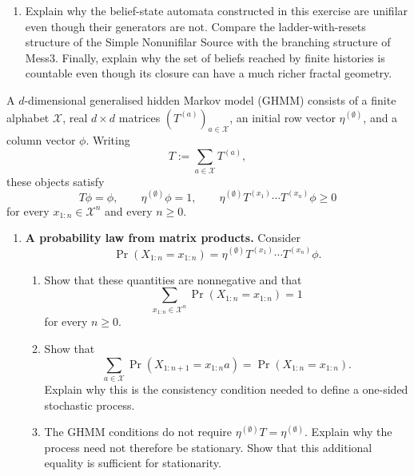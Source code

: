 \documentclass[11pt]{article}
\begin{document}
\begin{exercise}
\begin{enumerate}
\begin{enumerate}
        \item Explain why the belief-state automata constructed in this
          exercise are unifilar even though their generators are not. Compare
          the ladder-with-resets structure of the Simple Nonunifilar Source
          with the branching structure of Mess3. Finally, explain why the set
          of beliefs reached by finite histories is countable even though its
          closure can have a much richer fractal geometry.
      \end{enumerate}
  \end{enumerate}
\end{exercise}

\begin{exercise}
\label{ex:p3-4}
  A $d$-dimensional generalised hidden Markov model (GHMM) consists of a
  finite alphabet $\mathcal X$, real $d\times d$ matrices
  $(T^{(a)})_{a\in\mathcal X}$, an initial row vector
  $\eta^{(\emptyset)}$, and a column vector $\phi$. Writing
  \[
    T:=\sum_{a\in\mathcal X}T^{(a)},
  \]
  these objects satisfy
  \[
    T\phi=\phi,\qquad
    \eta^{(\emptyset)}\phi=1,\qquad
    \eta^{(\emptyset)}T^{(x_1)}\cdots T^{(x_n)}\phi\geq0
  \]
  for every $x_{1:n}\in\mathcal X^n$ and every $n\geq0$.

  \begin{enumerate}
    \item \textbf{A probability law from matrix products.}
      Consider
      \[
        \Pr(X_{1:n}=x_{1:n})
          =\eta^{(\emptyset)}
            T^{(x_1)}\cdots T^{(x_n)}\phi.
      \]
      \begin{enumerate}
        \item Show that these quantities are nonnegative and that
          \[
            \sum_{x_{1:n}\in\mathcal X^n}
              \Pr(X_{1:n}=x_{1:n})=1
          \]
          for every $n\geq0$.

        \item Show that
          \[
            \sum_{a\in\mathcal X}
              \Pr(X_{1:n+1}=x_{1:n}a)
              =\Pr(X_{1:n}=x_{1:n}).
          \]
          Explain why this is the consistency condition needed to define a
          one-sided stochastic process.

        \item The GHMM conditions do not require
          $\eta^{(\emptyset)}T=\eta^{(\emptyset)}$. Explain why the process
          need not therefore be stationary. Show that this additional
          equality is sufficient for stationarity.
      \end{enumerate}


\end{enumerate}
\end{exercise}
\end{document}
